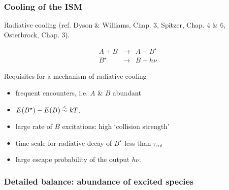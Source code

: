 \begin{frame}\frametitle{Cooling of the ISM}


Radiative cooling (ref.  Dyson \& Williams, Chap. 3, Spitzer, Chap. 4 \&
6, Osterbrock, Chap. 3). \medskip


\centering
\begin{minipage}[t]{6cm}
\begin{eqnarray*}
 A + B  & \rightarrow &  A + B^{\star} \\
 B^{\star} & \rightarrow  & B + h\nu  
\end{eqnarray*}
\end{minipage} 
\hfill
\begin{minipage}[t]{19cm}
Requisites for a mechanism of radiative cooling
\begin{itemize}

\item frequent encounters, i.e. $A$ \& $B$ abundant
\item $E(B^{\star}) - E(B) \stackrel{<}{\small \sim} k T$. 
\item large rate of $B$ excitations:  high  `collision strength'
\item time scale for radiative decay of  $B^\star$ less than  $\tau_\mathrm{col}$ 
\item large escape probability of the output $h\nu$.
\end{itemize}
\end{minipage} 
\vfill



\end{frame} \begin{frame}\frametitle{Detailed balance: abundance of
    excited species}

\raggedright


\end{frame}
